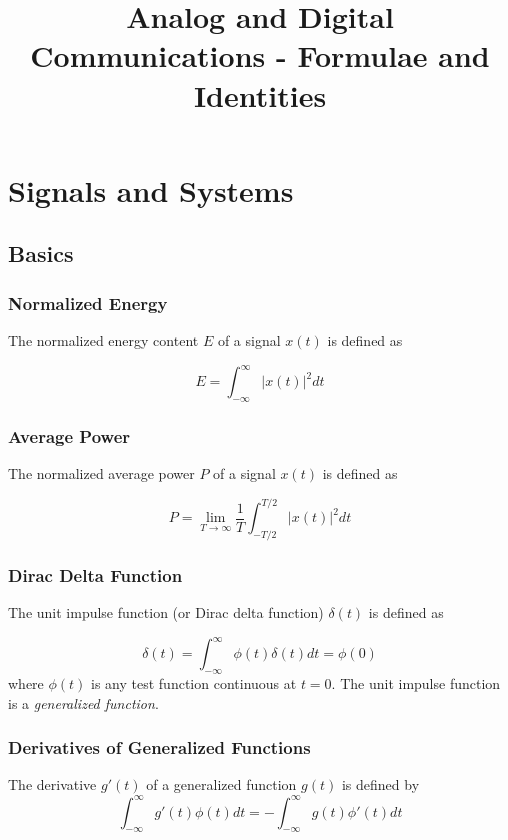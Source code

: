 \documentclass[]{article}
\title{Analog and Digital Communications - Formulae and Identities}
\begin{document}
\maketitle

\tableofcontents
\newpage

\section{Signals and Systems}
	
\subsection{Basics}
\subsubsection{Normalized Energy}
The normalized energy content $E$ of a signal $x(t)$ is defined as

\begin{equation} E = \int_{-\infty}^{\infty} |x(t)|^{2}dt \label{norm_energy} \end{equation}

\subsubsection{Average Power}
The normalized average power $P$ of a signal $x(t)$ is defined as

\begin{equation} P = \lim_{T \to \infty} \frac{1}{T} \int_{-T/2}^{T/2} |x(t)|^{2} dt\label{norm_power}\end{equation} 

\subsubsection{Dirac Delta Function}
The unit impulse function (or Dirac delta function) $\delta (t)$ is defined as

\begin{equation}\delta (t) = \int_{-\infty}^{\infty} \phi(t) \delta (t)dt = \phi(0)\label{dirac_def}\end{equation}
where $\phi (t) $ is any test function continuous at $t=0$. The unit impulse function is a \textit{generalized function}.

\subsubsection{Derivatives of Generalized Functions}
The derivative $g'(t)$ of a generalized function $g(t)$ is defined by
\begin{equation}\int_{-\infty}^{\infty} g'(t) \phi(t) dt = - \int_{-\infty}^{\infty} g(t) \phi '(t)dt\label{gen_func_def} \end{equation}
\end{document}
